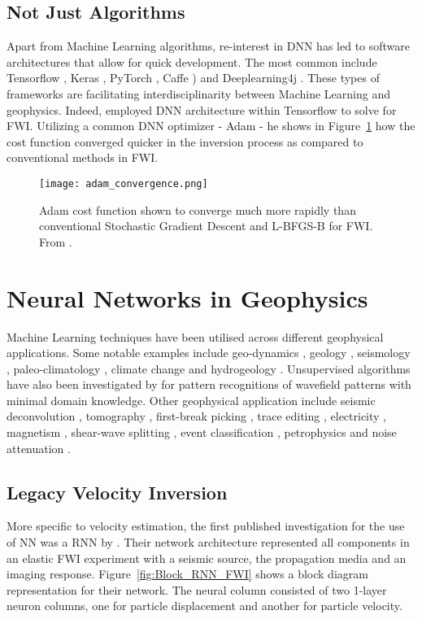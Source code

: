 \subsection{Not Just Algorithms}
Apart from Machine Learning algorithms, re-interest in DNN has led to software architectures that allow for quick development. The most common include Tensorflow \citep{Abadi2015}, Keras \citep{Chollet2015}, PyTorch \citep{Paszke2017}, Caffe \citep{Jia2014}) and Deeplearning4j \citep{Nicholson2016}. These types of frameworks are facilitating interdisciplinarity between Machine Learning and geophysics. Indeed, \cite{Richardson2018} employed DNN architecture within Tensorflow to solve for FWI. Utilizing a common DNN optimizer - Adam - he shows in Figure~\ref{fig:state_of_art_adam} how the cost function converged quicker in the inversion process as compared to conventional methods in FWI. 
\begin{figure}[ht!]
	\centering
	\texttt{[image: adam\_convergence.png]}
	\caption[Faster convergence of Adam cost function.]{Adam cost function shown to converge much more rapidly than conventional Stochastic Gradient Descent and L-BFGS-B for FWI. From \cite{Richardson2018}.}
	\label{fig:state_of_art_adam}
\end{figure}

\section{Neural Networks in Geophysics}\label{sec:app_geophysics}
Machine Learning techniques have been utilised across different geophysical applications. Some notable examples include geo-dynamics \citep{Shahnas2018}, geology \citep{Reading2015}, seismology \citep{Shimshoni1998}, paleo-climatology \citep{Dowla1996}, climate change \citep{Anderson2018} and hydrogeology \citep{Hamshaw2018}. Unsupervised algorithms have also been investigated by \citet{Kohler2010} for pattern recognitions of wavefield patterns with minimal domain knowledge. Other geophysical application include seismic deconvolution \citep{Wang1992, CaldeOn-Macias1997}, tomography \citep{Nath1999}, first-break picking \citep{Murat1992}, trace editing \citep{McCormack1993a}, electricity \citep{Poulton1992}, magnetism \citep{Zhang1997}, shear-wave splitting \citep{Dai1994}, event classification \citep{Romeo1994}, petrophysics \citep{Downton2018} and noise attenuation \citep{Li2018a, Halpert2018}. 

\subsection{Legacy Velocity Inversion}
More specific to velocity estimation, the first published investigation for the use of NN was a RNN by \citet{Michaels1992}. Their network architecture represented all components in an elastic FWI experiment with a seismic source, the propagation media and an imaging response. Figure~\ref{fig:Block_RNN_FWI} shows a block diagram representation for their network. The neural column consisted of two 1-layer neuron columns, one for particle displacement and another for particle velocity. 

